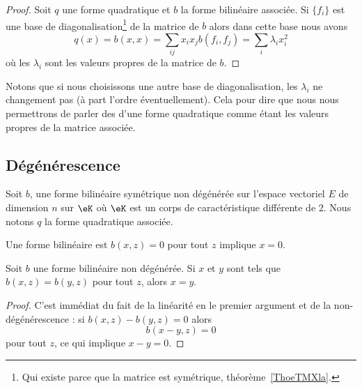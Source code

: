 \begin{proof}
    Soit \( q\) une forme quadratique et \( b\) la forme bilinéaire associée. Si \( \{ f_i \}\) est une base de diagonalisation\footnote{Qui existe parce que la matrice est symétrique, théorème~\ref{ThoeTMXla}.} de la matrice de \( b\) alors dans cette base nous avons
\begin{equation}
    q(x)=b(x,x)=\sum_{ij}x_ix_jb(f_i,f_j)=\sum_i\lambda_ix_i^2
\end{equation}
où les \( \lambda_i\) sont les valeurs propres de la matrice de \( b\).
\end{proof}
Notons que si nous choisissons une autre base de diagonalisation, les \( \lambda_i\) ne changement pas (à part l'ordre éventuellement). Cela pour dire que nous nous permettrons de parler des  d'une forme quadratique comme étant les valeurs propres de la matrice associée.

\subsection{Dégénérescence}

Soit \( b\), une forme bilinéaire symétrique non dégénérée  sur l'espace vectoriel \( E\) de dimension \( n\) sur \( \eK\) où \( \eK\) est un corps de caractéristique différente de \( 2\). Nous notons \( q\) la forme quadratique associée.

\begin{definition}
    Une forme bilinéaire est  \( b(x,z)=0\) pour tout \( z\) implique \( x=0\).
\end{definition}

\begin{lemma}   \label{LemyKJpVP}
    Soit \( b\) une forme bilinéaire non dégénérée. Si \( x\) et \( y\) sont tels que \( b(x,z)=b(y,z)\) pour tout \( z\), alors \( x=y\).
\end{lemma}

\begin{proof}
    C'est immédiat du fait de la linéarité en le premier argument et de la non-dégénérescence : si \( b(x,z)-b(y,z)=0\) alors
    \begin{equation}
        b(x-y,z)=0
    \end{equation}
    pour tout \( z\), ce qui implique \( x-y=0\).
\end{proof}

